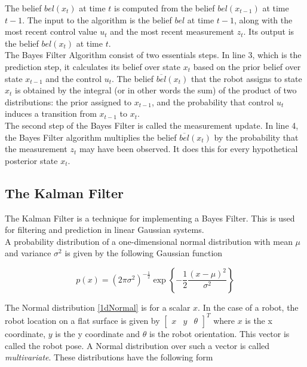 \documentclass[conference]{IEEEtran}
\begin{document}
The belief $bel(x_t)$ at time $t$ is computed from the belief $bel(x_{t-1})$ at time $t-1$. The input to the algorithm is the belief $bel$ at time $t-1$, along with the most recent control value $u_t$ and the most recent measurement $z_t$. Its output is the belief $bel(x_t)$ at time $t$.\\

The Bayes Filter Algorithm consist of two essentials steps. In line 3, which is the prediction step, it calculates its belief over state $x_t$ based on the prior belief over state $x_{t-1}$ and the control $u_t$. The belief $\overline{bel}(x_t)$ that the robot assigns to state $x_t$ is obtained by the integral (or in other words the sum) of the product of two distributions: the prior assigned to $x_{t-1}$, and the probability that control $u_t$ induces a transition from $x_{t-1}$ to $x_t$.\\

The second step of the Bayes Filter is called the measurement update. In line 4, the Bayes Filter algorithm multiplies the belief $\overline{bel}(x_t)$ by the probability that the measurement $z_t$ may have been observed. It does this for every hypothetical posterior state $x_t$.

\subsection{The Kalman Filter}

The Kalman Filter is a technique for implementing a Bayes Filter\cite{thrun}. This is used for filtering and prediction in linear Gaussian systems.\\

A probability distribution of a one-dimensional normal distribution with mean $\mu$ and variance $\sigma ^2$ is given by the following Gaussian function
 
 \begin{equation}\label{1dNormal}
p(x) = (2 \pi \sigma ^ 2) ^ {-\frac{1}{2}} \exp\left\{ - \frac{1}{2} \frac{(x - \mu)^2}{\sigma ^ 2} \right\}
\end{equation}

The Normal distribution \ref{1dNormal} is for a scalar $x$. In the case of a robot, the robot location on a flat surface is given by $\begin{bmatrix} x &   y & \theta \end{bmatrix}^{T}$ where $x$ is the x coordinate, $y$ is the y coordinate and $\theta$ is the robot orientation. This vector is called the robot pose. A Normal distribution over such a vector is called \textit{multivariate}. These distributions have the following form
\end{document}
